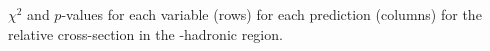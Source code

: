\begin{table}[htbp]
  \centering
  \resizebox{\textwidth}{!}{%
    
  }
  \caption{\(\chi^2\) and \(p\)-values for each variable (rows) for each
    prediction (columns) for the relative cross-section in the \Wboson-hadronic region.}%
  \label{tab:results:chi2:whad:normalised}
\end{table}

\clearpage

\FloatBarrier
